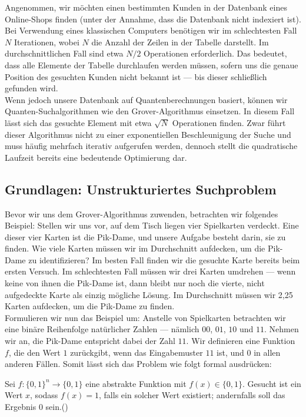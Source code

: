 {Angenommen, wir möchten einen bestimmten Kunden in der Datenbank eines Online-Shops finden (unter der Annahme, dass die Datenbank nicht indexiert ist). Bei Verwendung eines klassischen Computers benötigen wir im schlechtesten Fall $N$ Iterationen, wobei $N$ die Anzahl der Zeilen in der Tabelle darstellt. Im durchschnittlichen Fall sind etwa $N/2$ Operationen erforderlich. Das bedeutet, dass alle Elemente der Tabelle durchlaufen werden müssen, sofern uns die genaue Position des gesuchten Kunden nicht bekannt ist — bis dieser schließlich gefunden wird.\\

Wenn jedoch unsere Datenbank auf Quantenberechnungen basiert, können wir Quanten-Suchalgorithmen wie den Grover-Algorithmus einsetzen. In diesem Fall lässt sich das gesuchte Element mit etwa $\sqrt{N}$ Operationen finden. Zwar führt dieser Algorithmus nicht zu einer exponentiellen Beschleunigung der Suche und muss häufig mehrfach iterativ aufgerufen werden, dennoch stellt die quadratische Laufzeit bereits eine bedeutende Optimierung dar.

\subsection{Grundlagen: Unstrukturiertes Suchproblem}
Bevor wir uns dem Grover-Algorithmus zuwenden, betrachten wir folgendes Beispiel: Stellen wir uns vor, auf dem Tisch liegen vier Spielkarten verdeckt. Eine dieser vier Karten ist die Pik-Dame, und unsere Aufgabe besteht darin, sie zu finden. Wie viele Karten müssen wir im Durchschnitt aufdecken, um die Pik-Dame zu identifizieren? Im besten Fall finden wir die gesuchte Karte bereits beim ersten Versuch. Im schlechtesten Fall müssen wir drei Karten umdrehen — wenn keine von ihnen die Pik-Dame ist, dann bleibt nur noch die vierte, nicht aufgedeckte Karte als einzig mögliche Lösung. Im Durchschnitt müssen wir 2{,}25 Karten aufdecken, um die Pik-Dame zu finden.\\

Formulieren wir nun das Beispiel um: Anstelle von Spielkarten betrachten wir eine binäre Reihenfolge natürlicher Zahlen — nämlich $00$, $01$, $10$ und $11$. Nehmen wir an, die Pik-Dame entspricht dabei der Zahl $11$. Wir definieren eine Funktion $f$, die den Wert $1$ zurückgibt, wenn das Eingabemuster $11$ ist, und $0$ in allen anderen Fällen. Somit lässt sich das Problem wie folgt formal ausdrücken:

\begin{definition}
Sei $f\colon \{0, 1\}^n \rightarrow \{0, 1\}$ eine abstrakte Funktion mit $f(x) \in \{0, 1\}$. Gesucht ist ein Wert $x$, sodass $f(x) = 1$, falls ein solcher Wert existiert; andernfalls soll das Ergebnis $0$ sein.(\cite{montanaro_quantum_2016})
\end{definition}

}

